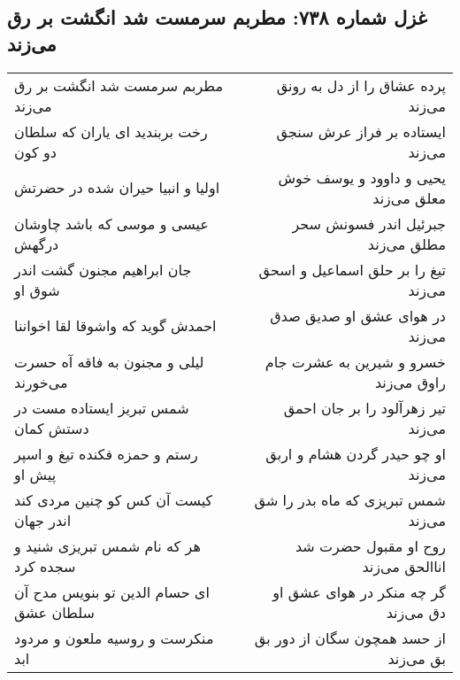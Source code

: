 \begin{center}
\section*{غزل شماره ۷۳۸: مطربم سرمست شد انگشت بر رق می‌زند}
\label{sec:0738}
\begin{longtable}{l p{0.5cm} r}
مطربم سرمست شد انگشت بر رق می‌زند
&&
پرده عشاق را از دل به رونق می‌زند
\\
رخت بربندید ای یاران که سلطان دو کون
&&
ایستاده بر فراز عرش سنجق می‌زند
\\
اولیا و انبیا حیران شده در حضرتش
&&
یحیی و داوود و یوسف خوش معلق می‌زند
\\
عیسی و موسی که باشد چاوشان درگهش
&&
جبرئیل اندر فسونش سحر مطلق می‌زند
\\
جان ابراهیم مجنون گشت اندر شوق او
&&
تیغ را بر حلق اسماعیل و اسحق می‌زند
\\
احمدش گوید که واشوقا لقا اخواننا
&&
در هوای عشق او صدیق صدق می‌زند
\\
لیلی و مجنون به فاقه آه حسرت می‌خورند
&&
خسرو و شیرین به عشرت جام راوق می‌زند
\\
شمس تبریز ایستاده مست در دستش کمان
&&
تیر زهرآلود را بر جان احمق می‌زند
\\
رستم و حمزه فکنده تیغ و اسپر پیش او
&&
او چو حیدر گردن هشام و اربق می‌زند
\\
کیست آن کس کو چنین مردی کند اندر جهان
&&
شمس تبریزی که ماه بدر را شق می‌زند
\\
هر که نام شمس تبریزی شنید و سجده کرد
&&
روح او مقبول حضرت شد اناالحق می‌زند
\\
ای حسام الدین تو بنویس مدح آن سلطان عشق
&&
گر چه منکر در هوای عشق او دق می‌زند
\\
منکرست و روسیه ملعون و مردود ابد
&&
از حسد همچون سگان از دور بق بق می‌زند
\\
\end{longtable}
\end{center}
